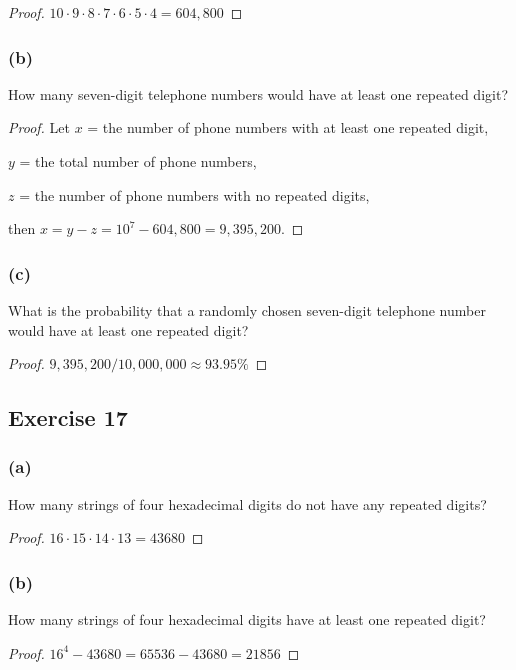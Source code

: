 \documentclass[14pt]{extarticle}
\begin{document}
\begin{proof}
     \(10 \cdot 9 \cdot 8 \cdot 7 \cdot 6 \cdot 5 \cdot 4 = 604,800\)
\end{proof}

\subsubsection{(b)}
How many seven-digit telephone numbers would have at least one repeated digit?

\begin{proof}
     Let $x$ = the number of phone numbers with at least one repeated digit,

     $y$ = the total number of phone numbers,

     $z$ = the number of phone numbers with no repeated digits,

     then \(x = y - z = 10^7 - 604,800 = 9,395,200\).
\end{proof}

\subsubsection{(c)}
What is the probability that a randomly chosen seven-digit telephone number would have at least one repeated digit?

\begin{proof}
     \(9,395,200 / 10,000,000 \approx 93.95\%\)
\end{proof}

\subsection{Exercise 17}
\subsubsection{(a)}
How many strings of four hexadecimal digits do not have any repeated digits?

\begin{proof}
     \(16 \cdot 15 \cdot 14 \cdot 13 = 43680\)
\end{proof}

\subsubsection{(b)}
How many strings of four hexadecimal digits have at least one repeated digit?

\begin{proof}
     \(16^4 - 43680 = 65536 - 43680 = 21856\)
\end{proof}
\end{document}
